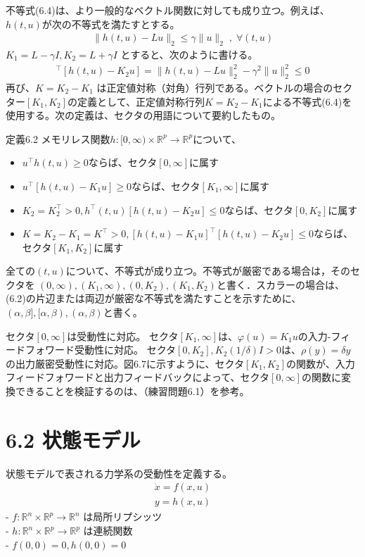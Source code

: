 \documentclass{jsarticle}
\begin{document}
不等式(6.4)は、より一般的なベクトル関数に対しても成り立つ。例えば、$h(t, u)$が次の不等式を満たすとする。
\begin{align}
  \|h(t,u)-Lu\|_2 \leq \gamma\|u\|_2 \;,\; \forall (t,u)
\end{align}
$K_1 = L-\gamma I,K_2 = L+\gamma I$ とすると、次のように書ける。
\begin{align}
  [h(t,u)-K_1u]^\top [h(t,u)-K_2u] = \|h(t,u)-Lu\|^2_2-\gamma^2\|u\|^2_2 \leq 0
\end{align}
再び、$K = K_2 - K_1$ は正定値対称（対角）行列である。ベクトルの場合のセクター$[K_1, K_2]$の定義として、正定値対称行列$K = K_2 - K_1$による不等式(6.4)を使用する。次の定義は、セクタの用語について要約したもの。

\begin{itembox}[l]{定義6.2}
  メモリレス関数$h\colon [0,\infty)\times\mathbb R^p \rightarrow \mathbb R^p$について、
  \begin{itemize}
    \item $u^\top h(t,u)\geq 0$ならば、セクタ$[0,\infty]$に属す 
    \item $u^\top [h(t,u)-K_1u]\geq 0$ならば、セクタ$[K_1,\infty]$に属す
    \item $K_2 = K_2^\top >0,h^\top (t,u)[h(t,u)-K_2u]\leq 0$ならば、セクタ$[0,K_2]$に属す
    \item $K=K_2-K_1=K^\top >0,[h(t,u)-K_1u]^\top [h(t,u)-K_2u]\leq 0$ならば、セクタ$[K_1,K_2]$に属す
  \end{itemize}
  
  全ての$(t,u)$について、不等式が成り立つ。不等式が厳密である場合は，そのセクタを $(0,\infty),(K_1,\infty),(0,K_2),(K_1,K_2)$と書く．スカラーの場合は、(6.2)の片辺または両辺が厳密な不等式を満たすことを示すために、$(\alpha, \beta],[\alpha, \beta),(\alpha, \beta)$と書く。
\end{itembox}
セクタ$[0, \infty]$は受動性に対応。
セクタ$[K_1,\infty]$は、$\varphi(u) = K_1u$の入力-フィードフォワード受動性に対応。
セクタ$[0,K_2],K_2 (1/\delta)I > 0$は、$\rho(y) = \delta y$の出力厳密受動性に対応。図6.7に示すように、セクタ$[K_1,K_2]$の関数が、入力フィードフォワードと出力フィードバックによって、セクタ$[0, \infty]$の関数に変換できることを検証するのは、（練習問題6.1）を参考。

\section*{6.2 状態モデル}
状態モデルで表される力学系の受動性を定義する。
\begin{align}
  \dot x = f(x,u) \tag{6.6}\\
  y = h(x,u) \tag{6.7}
\end{align}
- $f \colon \mathbb R^n \times \mathbb R^p \rightarrow \mathbb R^n$ は局所リプシッツ\\
- $h \colon \mathbb R^n \times \mathbb R^p \rightarrow \mathbb R^p$ は連続関数\\
- $f(0,0)=0,h(0,0) = 0$\\
\end{document}

